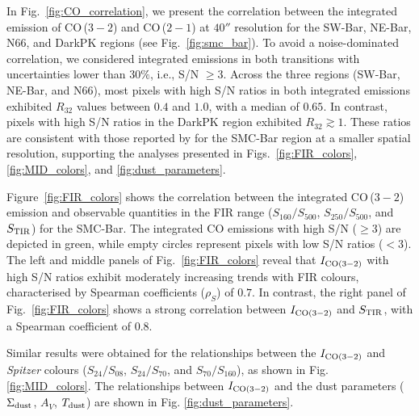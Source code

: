 \documentclass[baaa]{baaa}
\begin{document}
In Fig.~\ref{fig:CO_correlation}, we present the correlation between the integrated emission of CO\,($3-2$) and CO\,($2-1$) at $40''$ resolution for the SW-Bar, NE-Bar, N66, and DarkPK regions (see Fig.~\ref{fig:smc_bar}). To avoid a noise-dominated correlation, we considered integrated emissions in both transitions with uncertainties lower than $30\%$, i.e., S/N $\ge 3$. Across the three regions (SW-Bar, NE-Bar, and N66), most pixels with high S/N ratios in both integrated emissions exhibited $R_{32}$ values between $0.4$ and $1.0$, with a median of $0.65$. In contrast, pixels with high S/N ratios in the DarkPK region exhibited $R_{32} \gtrsim 1$. These ratios are consistent with those reported by \cite{Saldanio_2024_AA_687A_26S} for the SMC-Bar region at a smaller spatial resolution, supporting the analyses presented in Figs.~\ref{fig:FIR_colors}, \ref{fig:MID_colors}, and \ref{fig:dust_parameters}.

Figure~\ref{fig:FIR_colors} shows the correlation between the integrated CO\,($3-2$) emission and observable quantities in the FIR range ($S_{160}/S_{500}$, $S_{250}/S_{500}$, and $S_{\rm TIR}$) for the SMC-Bar. The integrated CO emissions with high S/N ($\ge 3$) are depicted in green, while empty circles represent pixels with low S/N ratios ($< 3$). The left and middle panels of Fig.~\ref{fig:FIR_colors} reveal that $I_{{\rm CO}(3-2)}$ with high S/N ratios exhibit moderately increasing trends with FIR colours, characterised by Spearman coefficients ($\rho_{S}$) of $0.7$. In contrast, the right panel of Fig.~\ref{fig:FIR_colors} shows a strong correlation between $I_{{\rm CO}(3-2)}$ and $S_{\rm TIR}$, with a Spearman coefficient of $0.8$.

Similar results were obtained for the relationships between the $I_{{\rm CO}(3-2)}$ and {\it Spitzer} colours ($S_{24}/S_{08}$, $S_{24}/S_{70}$, and $S_{70}/S_{160}$), as shown in Fig. \ref{fig:MID_colors}. The relationships between $I_{{\rm CO}(3-2)}$ and the dust parameters ($\Sigma_{\rm dust}$, $A_{V}$, $T_{\rm dust}$) are shown in Fig. \ref{fig:dust_parameters}.
\end{document}
